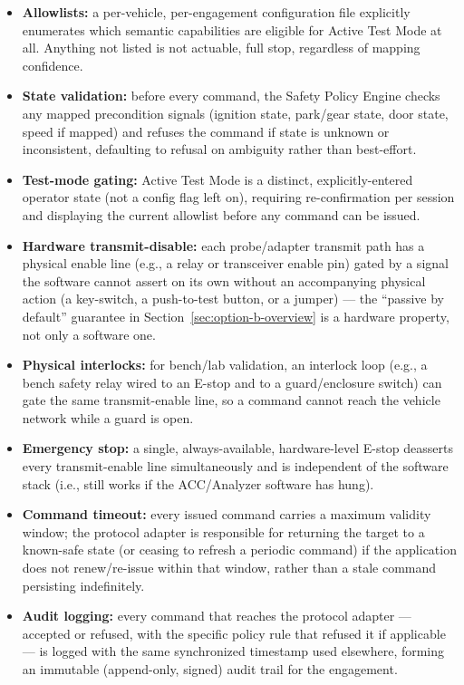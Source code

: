 \begin{itemize}
\item \textbf{Allowlists:} a per-vehicle, per-engagement configuration file explicitly enumerates which semantic capabilities are eligible for Active Test Mode at all. Anything not listed is not actuable, full stop, regardless of mapping confidence.
\item \textbf{State validation:} before every command, the Safety Policy Engine checks any mapped precondition signals (ignition state, park/gear state, door state, speed if mapped) and refuses the command if state is unknown or inconsistent, defaulting to refusal on ambiguity rather than best-effort.
\item \textbf{Test-mode gating:} Active Test Mode is a distinct, explicitly-entered operator state (not a config flag left on), requiring re-confirmation per session and displaying the current allowlist before any command can be issued.
\item \textbf{Hardware transmit-disable:} each probe/adapter transmit path has a physical enable line (e.g., a relay or transceiver enable pin) gated by a signal the software cannot assert on its own without an accompanying physical action (a key-switch, a push-to-test button, or a jumper) --- the ``passive by default'' guarantee in Section~\ref{sec:option-b-overview} is a hardware property, not only a software one.
\item \textbf{Physical interlocks:} for bench/lab validation, an interlock loop (e.g., a bench safety relay wired to an E-stop and to a guard/enclosure switch) can gate the same transmit-enable line, so a command cannot reach the vehicle network while a guard is open.
\item \textbf{Emergency stop:} a single, always-available, hardware-level E-stop deasserts every transmit-enable line simultaneously and is independent of the software stack (i.e., still works if the ACC/Analyzer software has hung).
\item \textbf{Command timeout:} every issued command carries a maximum validity window; the protocol adapter is responsible for returning the target to a known-safe state (or ceasing to refresh a periodic command) if the application does not renew/re-issue within that window, rather than a stale command persisting indefinitely.
\item \textbf{Audit logging:} every command that reaches the protocol adapter --- accepted or refused, with the specific policy rule that refused it if applicable --- is logged with the same synchronized timestamp used elsewhere, forming an immutable (append-only, signed) audit trail for the engagement.
\end{itemize}

